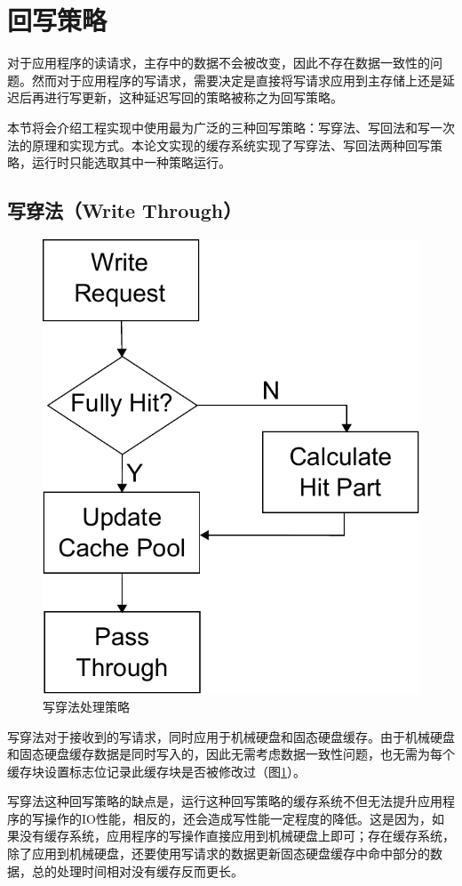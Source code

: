 \section{回写策略}
\label{sec:wb_strategy}

对于应用程序的读请求，主存中的数据不会被改变，因此不存在数据一致性的问题。然而对于应用程序的写请求，需要决定是直接将写请求应用到主存储上还是延迟后再进行写更新，这种延迟写回的策略被称之为回写策略\cite{writeback2014}。

本节将会介绍工程实现中使用最为广泛的三种回写策略：写穿法、写回法和写一次法的原理和实现方式。本论文实现的缓存系统实现了写穿法、写回法两种回写策略，运行时只能选取其中一种策略运行。

\subsection{写穿法（Write Through）}
\begin{figure}[!htb]
\centering
\includegraphics[width=0.4\linewidth]{./graph/write-through}
\caption{写穿法处理策略}
\label{fig:write-through}
\end{figure}

写穿法\cite{writethrough2010}对于接收到的写请求，同时应用于机械硬盘和固态硬盘缓存。由于机械硬盘和固态硬盘缓存数据是同时写入的，因此无需考虑数据一致性问题，也无需为每个缓存块设置标志位记录此缓存块是否被修改过（图\ref{fig:write-through}）。

写穿法这种回写策略的缺点是，运行这种回写策略的缓存系统不但无法提升应用程序的写操作的IO性能，相反的，还会造成写性能一定程度的降低。这是因为，如果没有缓存系统，应用程序的写操作直接应用到机械硬盘上即可；存在缓存系统，除了应用到机械硬盘，还要使用写请求的数据更新固态硬盘缓存中命中部分的数据，总的处理时间相对没有缓存反而更长。

